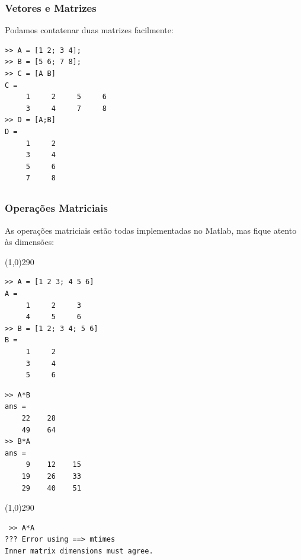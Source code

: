 \documentclass{beamer}
\newcommand{\delim}{\line(1,0){290}}
\begin{document}
\begin{frame}[fragile]
\frametitle{Vetores e Matrizes}
Podamos contatenar duas matrizes facilmente:
\begin{verbatim}
>> A = [1 2; 3 4];
>> B = [5 6; 7 8];
>> C = [A B]
C =
     1     2     5     6
     3     4     7     8
>> D = [A;B]
D =
     1     2
     3     4
     5     6
     7     8
\end{verbatim}
\end{frame}

\subsection[Opera\c{c}\~oes Matriciais]{}

\begin{frame}[fragile]
\frametitle{Opera\c{c}\~oes Matriciais}

As opera\c{c}\~oes matriciais est\~ao todas implementadas no Matlab, mas fique atento \`as dimens\~oes:

\delim
{\scriptsize
\begin{center}
\begin{minipage}{4 cm}
\begin{verbatim}
>> A = [1 2 3; 4 5 6]
A = 
     1     2     3
     4     5     6
>> B = [1 2; 3 4; 5 6]
B = 
     1     2
     3     4
     5     6
\end{verbatim}
\end{minipage}\hspace{1.5 cm}
\begin{minipage}{4 cm}
\begin{verbatim}
>> A*B
ans =
    22    28
    49    64
>> B*A
ans =
     9    12    15
    19    26    33
    29    40    51
\end{verbatim}
\end{minipage}
\end{center}
\delim
\begin{center}
\begin{minipage}{6 cm}
\begin{verbatim}
 >> A*A
??? Error using ==> mtimes
Inner matrix dimensions must agree.
\end{verbatim}
\end{minipage}
\end{center}
}

\end{frame}
\end{document}
